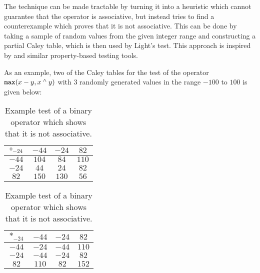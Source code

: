 The technique can be made tractable by turning it into a heuristic which cannot guarantee
that the operator is associative, but instead tries to find a counterexample which proves
that it is not associative. This can be done by taking a sample of random values from the
given integer range and constructing a partial Caley table, which is then used by Light's
test. This approach is inspired by \cite{quickcheck} and similar property-based
testing tools.

As an example, two of the Caley tables for the test of the operator $\texttt{max}(x - y, x \mathbin{^\wedge} y)$
with 3 randomly generated values in the range $-100$ to $100$ is given below:

\begin{table}[h!]
  \def\arraystretch{1.2}
  \begin{tabular}{|c|ccc|}
    \hline
    $\circ_{-24}$ & $-44$ & $-24$ & $82$ \\
    \hline
        $-44$ & $104$ & $84$  & $110$ \\ 
        $-24$ & $44$  & $24$  & $82$  \\
        $82$  & $150$ & $130$ & $56$  \\
    \hline
  \end{tabular}
\quad
  \begin{tabular}{|c|ccc|}
    \hline
    $*_{-24}$ & $-44$ & $-24$ & $82$ \\
    \hline
        $-44$ & $-24$ & $-44$  & $110$ \\ 
        $-24$ & $-44$  & $-24$  & $82$  \\
        $82$  & $110$ & $82$ & $152$  \\
    \hline
  \end{tabular}
  \centering
  \caption{Example test of a binary operator which shows that it is not associative.}
\end{table}
